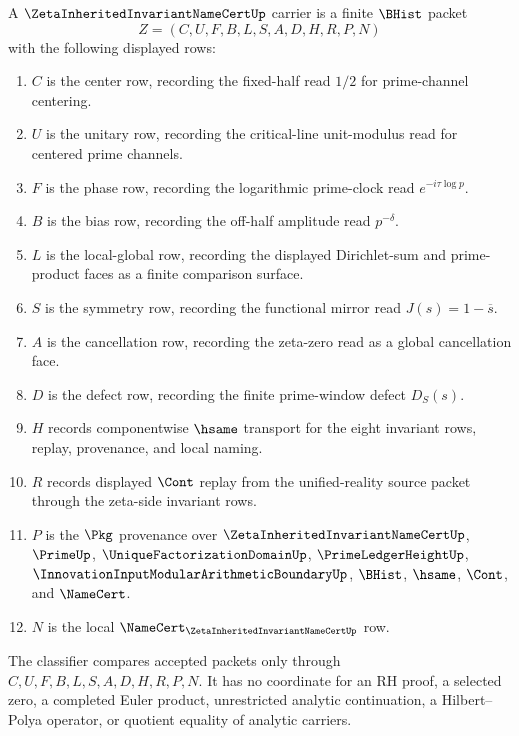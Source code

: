 \begin{definition}
\label{def:zeta-inherited-invariant-namecert-carrier}
A $\ZetaInheritedInvariantNameCertUp$ carrier is a finite $\BHist$ packet
$$
Z=(C,U,F,B,L,S,A,D,H,R,P,N)
$$
with the following displayed rows:
\begin{enumerate}
\item $C$ is the center row, recording the fixed-half read $1/2$ for prime-channel centering.
\item $U$ is the unitary row, recording the critical-line unit-modulus read for centered prime channels.
\item $F$ is the phase row, recording the logarithmic prime-clock read $e^{-i\tau\log p}$.
\item $B$ is the bias row, recording the off-half amplitude read $p^{-\delta}$.
\item $L$ is the local-global row, recording the displayed Dirichlet-sum and prime-product faces as a finite comparison surface.
\item $S$ is the symmetry row, recording the functional mirror read $J(s)=1-\overline{s}$.
\item $A$ is the cancellation row, recording the zeta-zero read as a global cancellation face.
\item $D$ is the defect row, recording the finite prime-window defect $D_S(s)$.
\item $H$ records componentwise $\hsame$ transport for the eight invariant rows, replay, provenance, and local naming.
\item $R$ records displayed $\Cont$ replay from the unified-reality source packet through the zeta-side invariant rows.
\item $P$ is the $\Pkg$ provenance over $\ZetaInheritedInvariantNameCertUp$, $\PrimeUp$, $\UniqueFactorizationDomainUp$, $\PrimeLedgerHeightUp$, $\InnovationInputModularArithmeticBoundaryUp$, $\BHist$, $\hsame$, $\Cont$, and $\NameCert$.
\item $N$ is the local $\NameCert_{\ZetaInheritedInvariantNameCertUp}$ row.
\end{enumerate}
The classifier compares accepted packets only through $C,U,F,B,L,S,A,D,H,R,P,N$. It has no coordinate for an RH proof, a selected zero, a completed Euler product, unrestricted analytic continuation, a Hilbert--Polya operator, or quotient equality of analytic carriers.
\end{definition}

